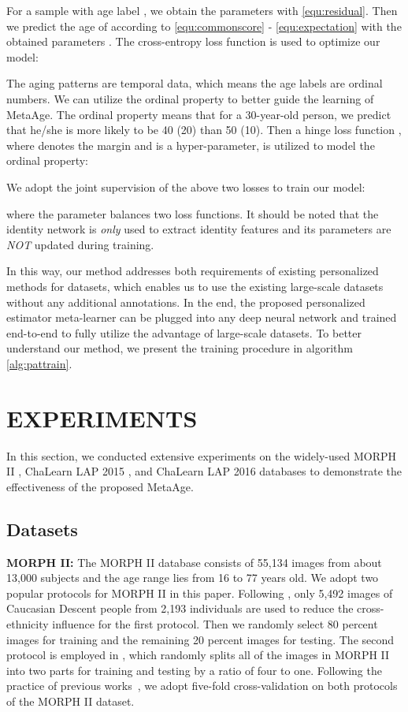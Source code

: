 \documentclass[journal,twoside]{IEEEtran}
\begin{document}
For a sample  with age label , we obtain the parameters  with \eqref{equ:residual}. Then we predict the age of  according to  \eqref{equ:commonscore} - \eqref{equ:expectation} with the obtained parameters . The cross-entropy loss function is used to optimize our model:


The aging patterns are temporal data, which means the age labels are ordinal numbers. We can utilize the ordinal property to better guide the learning of MetaAge. The ordinal property means that for a 30-year-old person, we predict that he/she is more likely to be 40 (20) than 50 (10).
Then a hinge loss function , where  denotes the margin and is a hyper-parameter,
is utilized to model the ordinal property:


We adopt the joint supervision of the above two losses to train our model:

where the parameter  balances two loss functions. It should be noted that the identity network  is \emph{only} used to extract identity features and its parameters  are \emph{NOT} updated during training.


In this way, our method addresses both requirements of existing personalized methods for datasets, which enables us to use the existing large-scale datasets  without any additional annotations. In the end, the proposed personalized estimator meta-learner can be plugged into any deep neural network and trained end-to-end to fully utilize the advantage of large-scale datasets. To better understand our method, we present the training procedure in algorithm \ref{alg:pattrain}.





\section{EXPERIMENTS}
In this section, we conducted extensive experiments on the widely-used MORPH II \cite{ricanek2006morph},  ChaLearn LAP 2015 \cite{escalera2015chalearn}, and ChaLearn LAP 2016 \cite{escalera2016chalearn} databases to demonstrate the effectiveness of the proposed MetaAge.

\subsection{Datasets}


\textbf{MORPH II:} The MORPH II database \cite{ricanek2006morph} consists of 55,134 images from about 13,000 subjects and the age range lies from 16 to 77 years old. We adopt two popular protocols for MORPH II in this paper. Following \cite{chang2011ordinal,agustsson2017anchored,rothe2018deep}, only 5,492 images of Caucasian Descent people from 2,193 individuals are used to reduce the cross-ethnicity influence for the first protocol. Then we randomly select 80 percent images for training and the remaining 20 percent images for testing. The second protocol is employed in \cite{shen2017label,chen2017using}, which randomly splits all of the images in MORPH II into two parts for training and testing by a ratio of four to one.
Following the practice of previous works~\cite{pan2020self,shen2018deep}, we adopt five-fold cross-validation on both protocols of the MORPH II dataset. 
\end{document}
